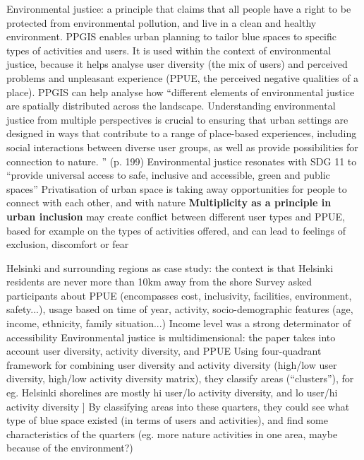 \documentclass{article}
\newcommand{\alignedmarginpar}[1]{%
        \marginpar{\raggedright\small #1}
    }
\begin{document}
\begin{outline}
	\1 Environmental justice: a principle that claims that all people have a right to be protected from environmental pollution, and live in a clean and healthy environment. 
		\2  PPGIS enables urban planning to tailor blue spaces to specific types of activities and users. It is used within the context of environmental justice, because it helps analyse user diversity (the mix of users) and perceived problems and unpleasant experience (PPUE, the perceived negative qualities of a place). PPGIS can help analyse how ``different elements of environmental justice are spatially distributed across the landscape. Understanding environmental justice from multiple perspectives is crucial to ensuring that urban settings are designed in ways that contribute to a range of place-based experiences, including social interactions between diverse user groups, as well as provide possibilities for connection to nature. '' (p. 199)
		\2 Environmental justice resonates with SDG 11 to ``provide universal access to safe, inclusive and accessible, green and public spaces''
		\2 Privatisation of urban space is taking away opportunities for people to connect with each other, and with nature
		\2 \textbf{Multiplicity as a principle in urban inclusion} may create conflict between different user types and PPUE, based for example on the types of activities offered, and can lead to feelings of exclusion, discomfort or fear\alignedmarginpar{Inclusivity in public space\\Right to blue space}
	\1 Helsinki and surrounding regions as case study: the context is that Helsinki residents are never more than 10km away from the shore
		\2 Survey asked participants about PPUE (encompasses cost, inclusivity, facilities, environment, safety...), usage based on time of year, activity, socio-demographic features (age, income, ethnicity, family situation...)
		\2 Income level was a strong determinator of accessibility
	\1 Environmental justice is multidimensional: the paper takes into account user diversity, activity diversity, and PPUE
		\2 Using four-quadrant framework for combining user diversity and activity diversity (high/low user diversity, high/low activity diversity matrix), they classify areas (``clusters''), for eg. Helsinki shorelines are mostly hi user/lo activity diversity, and lo user/hi activity diversity ]
		\2 By classifying areas into these quarters, they could see what type of blue space existed (in terms of users and activities), and find some characteristics of the quarters (eg. more nature activities in one area, maybe because of the environment?)

\end{outline}
\end{document}
